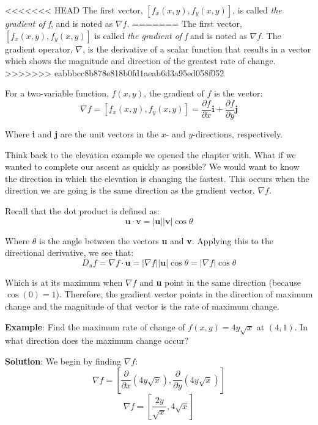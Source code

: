 <<<<<<< HEAD
The first vector, $\left[ f_x(x, y), f_y(x, y) \right]$, is called \textit{the 
gradient of f}, and is noted as $\nabla f$. 
=======
The first vector, $\left[ f_x(x, y), f_y(x, y) \right]$ is called \textit{the 
gradient of f} and is noted as $\nabla f$. The gradient 
operator, $\nabla$, is the derivative of a scalar function that results in a 
vector which shows the magnitude and direction of the greatest rate of change. 
>>>>>>> eabbbcc8b878e818b0fd1aeab6d3a95ed058f052

\begin{mdframed}[style = important, frametitle = {The Gradient}]
For a two-variable function, $f(x, y)$, the gradient of $f$ is the vector:
$$\nabla f = \left[ f_x(x, y), f_y(x, y) \right] = \frac{\partial f}{\partial 
x} \textbf{i} + \frac{\partial f}{\partial y} \textbf{j}$$

Where \textbf{i} and \textbf{j} are the unit vectors in the $x$- and 
$y$-directions, respectively.
\end{mdframed}

Think back to the elevation example we opened the chapter with. What if we 
wanted to complete our ascent as quickly as possible? We would want to 
know the direction in which the elevation is changing the fastest. This occurs 
when the direction we are going is the same direction as the gradient vector, 
$\nabla f$. 

Recall that the dot product is defined as:
$$\textbf{u} \cdot \textbf{v} = \left| \textbf{u} \right| \left| \textbf{v} 
\right| \cos{ \theta}$$

Where $\theta$ is the angle between the vectors \textbf{u} and \textbf{v}. 
Applying this to the directional derivative, we see that:
$$D_u f = \nabla f \cdot \textbf{u} = \left| \nabla f \right| \left| 
\textbf{u} \right| \cos{\theta} = \left| \nabla f \right| \cos{\theta}$$

Which is at its maximum when $\nabla f$ and \textbf{u} point in the same 
direction (because $\cos{\left( 0 \right)} = 1$). Therefore, the gradient 
vector points in the direction of maximum change and the magnitude of that 
vector is the rate of maximum change. 

\textbf{Example}: Find the maximum rate of change of $f(x, y) = 4y\sqrt{x}$ at 
$(4, 1)$. In what direction does the maximum change occur?

\textbf{Solution}: We begin by finding $\nabla f$:
$$\nabla f = \left[ \frac{\partial}{\partial x} \left( 4y\sqrt{x} \right), 
\frac{\partial}{\partial y} \left( 4y\sqrt{x} \right) \right]$$
$$\nabla f = \left[ \frac{2y}{\sqrt{x}}, 4\sqrt{x} \right]$$

